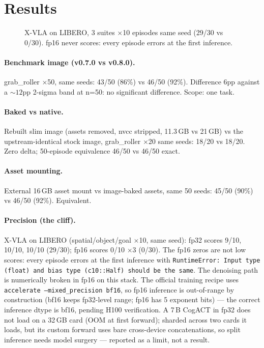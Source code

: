 \documentclass{article}
\begin{document}
\section{Results}
\label{sec:results}

\begin{figure}[t]
\centering
{}
\caption{X-VLA on LIBERO, 3 suites $\times$10 episodes same seed (29/30 vs
0/30). fp16 never scores: every episode errors at the first inference.}
\label{fig:cliff}
\end{figure}

\paragraph{Benchmark image (v0.7.0 vs v0.8.0).} grab\_roller $\times$50, same
seeds: 43/50 (86\%) vs 46/50 (92\%). Difference 6pp against a ${\sim}12$pp
2-sigma band at n=50: no significant difference. Scope: one task.

\paragraph{Baked vs native.} Rebuilt slim image (assets removed, nvcc
stripped, 11.3\,GB vs 21\,GB) vs the upstream-identical stock image,
grab\_roller $\times$20 same seeds: 18/20 vs 18/20. Zero delta; 50-episode
equivalence 46/50 vs 46/50 exact.

\paragraph{Asset mounting.} External 16\,GB asset mount vs image-baked
assets, same 50 seeds: 45/50 (90\%) vs 46/50 (92\%). Equivalent.

\paragraph{Precision (the cliff).} X-VLA on LIBERO (spatial/object/goal
$\times$10, same seed): fp32 scores 9/10, 10/10, 10/10 (29/30); fp16 scores
0/10 $\times$3 (0/30). The fp16 zeros are not low scores: every episode
errors at the first inference with
\texttt{RuntimeError: Input type (float) and bias type (c10::Half) should be
the same}. The denoising path is numerically broken in fp16 on this stack.
The official training recipe uses \texttt{accelerate --mixed\_precision bf16},
so fp16 inference is out-of-range by construction (bf16 keeps fp32-level range;
fp16 has 5 exponent bits) --- the correct inference dtype is bf16, pending
H100 verification. A 7\,B CogACT in fp32 does not load on a 32\,GB card (OOM at first forward);
sharded across two cards it loads, but its custom forward uses bare
cross-device concatenations, so split inference needs model surgery ---
reported as a limit, not a result.
\end{document}

